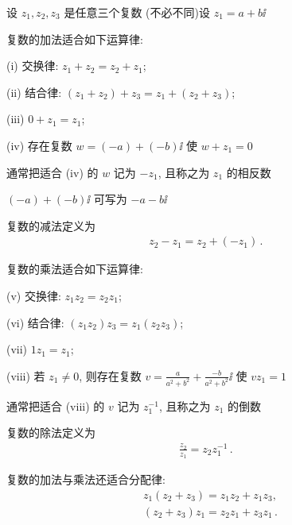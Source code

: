 设 $z_1, z_2, z_3$ 是任意三个复数 (不必不同)\period 设 $z_1 = a + b \ii$\period

\begin{proposition}
    复数的加法适合如下运算律:

    (i) 交换律: $z_1 + z_2 = z_2 + z_1$;

    (ii) 结合律: $(z_1 + z_2) + z_3 = z_1 + (z_2 + z_3)$;

    (iii) $0 + z_1 = z_1$;

    (iv) 存在复数 $w = (-a) + (-b) \ii$ 使 $w + z_1 = 0$\period

    通常把适合 (iv) 的 $w$ 记为 $-z_1$, 且称之为 $z_1$ 的相反数\period
\end{proposition}

\begin{remark}
    $(-a) + (-b) \ii$ 可写为 $-a-b \ii$\period
\end{remark}

\begin{definition}
    复数的减法定义为
    \begin{align*}
        z_2 - z_1 = z_2 + (-z_1) \period
    \end{align*}
\end{definition}

\begin{proposition}
    复数的乘法适合如下运算律:

    (v) 交换律: $z_1 z_2 = z_2 z_1$;

    (vi) 结合律: $(z_1 z_2) z_3 = z_1 (z_2 z_3)$;

    (vii) $1 z_1 = z_1$;

    (viii) 若 $z_1 \neq 0$, 则存在复数 $v = \frac{a}{a^2 + b^2} + \frac{-b}{a^2 + b^2} \ii$ 使 $v z_1 = 1$\period

    通常把适合 (viii) 的 $v$ 记为 $z_1^{-1}$, 且称之为 $z_1$ 的倒数\period
\end{proposition}

\begin{definition}
    复数的除法定义为
    \begin{align*}
        \frac{z_2}{z_1} = z_2 z_1^{-1} \period
    \end{align*}
\end{definition}

\begin{proposition}
    复数的加法与乘法还适合分配律:
    \begin{align*}
         & z_1 (z_2 + z_3) = z_1 z_2 + z_1 z_3,       \\
         & (z_2 + z_3) z_1 = z_2 z_1 + z_3 z_1\period
    \end{align*}
\end{proposition}

